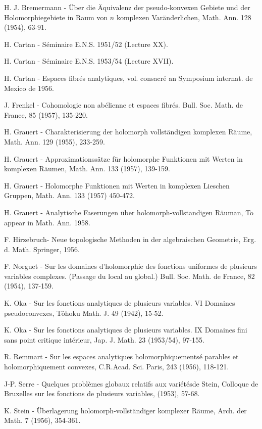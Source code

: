 \begin{thebibliography}{99}
 H. J. Bremermann - \"Uber die \"Aquivalenz der
  pseudo-konvexen Gebiete und der Holomorphiegebiete in Raum von $n$
  komplexen Var\"anderlichen, Math. Ann. 128 (1954), 63-91.

 H. Cartan - S\'eminaire E.N.S. 1951/52 (Lecture XX).

 H. Cartan - S\'eminaire E.N.S. 1953/54 (Lecture XVII). 

 H. Cartan - Espaces fibr\'es analytiques,
  vol. consacr\'e an Symposium internat. de Mexico de 1956.

 J. Frenkel - Cohomologie non ab\'elienne et espaces
  fibr\'es. Bull. Soc. Math. de France, 85 (1957), 135-220.

 H. Grauert - Charakterisierung der holomorph
  vollst\"andigen komplexen R\"aume, Math. Ann. 129 (1955), 233-259.

 H. Grauert - Approximationss\"atze f\"ur holomorphe
  Funktionen mit Werten in komplexen R\"aumen, Math. Ann. 133 (1957),
  139-159. 

 H. Grauert - Holomorphe Funktionen mit Werten in
  komplexen Lieschen Gruppen, Math. Ann. 133 (1957) 450-472. 

 H. Grauert - Analytische Faserungen \"uber
  holomorph-vollstandigen R\"auman, To appear in Math. Ann. 1958.

 F. Hirzebruch\pageoriginale - Neue topologische
  Methoden in der algebraischen Geometrie, Erg. d. Math. Springer,
  1956. 
 
 F. Norguet - Sur les domaines d'holomorphie des
  fonctions uniformes de plusieurs variables complexes. (Passage du
  local au global.) Bull. Soc. Math. de France, 82 (1954), 137-159. 

 K. Oka - Sur les fonctions analytiques de plusieurs
  variables. VI Domaines pseudoconvexes, T\^ohoku Math. J. 49 (1942),
  15-52. 

 K. Oka - Sur les fonctions analytiques de plusieurs
  variables. IX Domaines fini sans point critique int\'erieur,
  Jap. J. Math. 23 (1953/54), 97-155. 

 R. Remmart - Sur les espaces analytiques
  holomorphiquements\'e parables et holomorphiquement convexes,
  C.R.Acad. Sci. Paris, 243 (1956), 118-121.

 J-P. Serre - Quelques probl\`emes globaux relatifs aux
  vari\'et\'esde Stein, Colloque de Bruxelles sur les fonctions de
  plusieurs variables, (1953), 57-68.

 K. Stein - \"Uberlagerung holomorph-vollst\"andiger
  komplexer R\"aume, Arch. der Math. 7 (1956), 354-361. 

\end{thebibliography}
